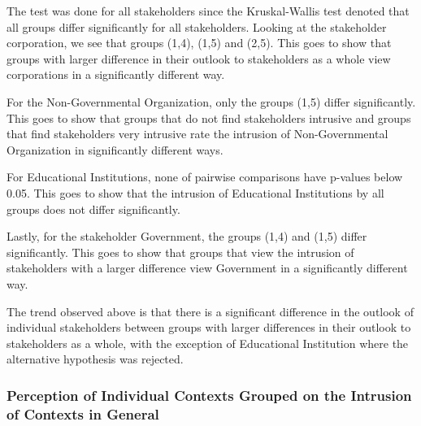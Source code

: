 The test was done for all stakeholders since the Kruskal-Wallis test denoted that all groups differ significantly for all stakeholders. Looking at the stakeholder corporation, we see that groups (1,4), (1,5) and (2,5). This goes to show that groups with larger difference in their outlook to stakeholders as a whole view corporations in a significantly different way.

For the Non-Governmental Organization, only the groups (1,5) differ significantly. This goes to show that groups that do not find stakeholders intrusive and groups that find stakeholders very intrusive rate the intrusion of Non-Governmental Organization in significantly different ways.

For Educational Institutions, none of pairwise comparisons have p-values below 0.05. This goes to show that the intrusion of Educational Institutions by all groups does not differ significantly.

Lastly, for the stakeholder Government, the groups (1,4) and (1,5) differ significantly. This goes to show that groups that view the intrusion of stakeholders with a larger difference view Government in a significantly different way.

The trend observed above is that there is a significant difference in the outlook of individual stakeholders between groups with larger differences
in their outlook to stakeholders as a whole, with the exception of Educational Institution where the alternative hypothesis was rejected.


\subsubsection{Perception of Individual Contexts Grouped on the Intrusion of Contexts in General}

